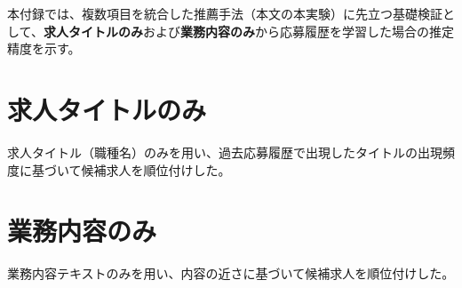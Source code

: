 
本付録では、複数項目を統合した推薦手法（本文の本実験）に先立つ基礎検証として、\textbf{求人タイトルのみ}および\textbf{業務内容のみ}から応募履歴を学習した場合の推定精度を示す。

\section{求人タイトルのみ}
求人タイトル（職種名）のみを用い、過去応募履歴で出現したタイトルの出現頻度に基づいて候補求人を順位付けした。

\begin{table}[H]
\centering
\caption{ワーカー別の推薦精度（求人タイトルのみ、30件学習、10件テスト）}
\label{tab:appc-worker-accuracy-title-only}
\scriptsize

\end{table}

\begin{table}[H]
\centering
\caption{学習件数別の精度推移（求人タイトルのみ、18名）}
\label{tab:appc-learning-curve-title-only-20workers}
\scriptsize

\end{table}

\begin{table}[H]
\centering
\caption{就業回数上位10名を除いた場合の精度推移（求人タイトルのみ）}
\label{tab:appc-learning-curve-title-only-excluding-top10}
\scriptsize

\end{table}

\section{業務内容のみ}
業務内容テキストのみを用い、内容の近さに基づいて候補求人を順位付けした。

\begin{table}[H]
\centering
\caption{学習件数別の精度推移（業務内容のみ、18名）}
\label{tab:appc-learning-curve-content-only-20workers}
\scriptsize

\end{table}

\begin{table}[H]
\centering
\caption{就業回数上位10名を除いた場合の精度推移（業務内容のみ）}
\label{tab:appc-learning-curve-content-only-excluding-top10}
\scriptsize

\end{table}
